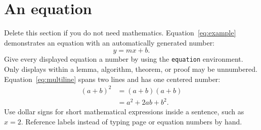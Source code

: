 \section{An equation}
Delete this section if you do not need mathematics. Equation~\ref{eq:example}
demonstrates an equation with an automatically generated number:
\begin{equation}
  y = mx + b.
  \label{eq:example}
\end{equation}
Give every displayed equation a number by using the \verb|equation|
environment. Only displays within a lemma, algorithm, theorem, or proof may
be unnumbered. Equation~\ref{eq:multiline} spans two lines and has one centered number:
\begin{equation}
  \begin{split}
    (a + b)^2 &= (a + b)(a + b) \\
              &= a^2 + 2ab + b^2.
  \end{split}
  \label{eq:multiline}
\end{equation}
Use dollar signs for short mathematical expressions inside a sentence, such as
$x = 2$. Reference labels instead of typing page or equation numbers by hand.
